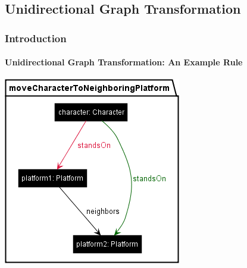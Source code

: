 \subsection{Unidirectional Graph Transformation}
	\begin{frame}
		\frametitle{Introduction}
		\framesubtitle{Unidirectional Graph Transformation: An Example Rule}
		\begin{center}
			\includegraphics[height=.75\textheight]{../common/figures/rule-moveCharacterToNeighboringPlatform}
		\end{center}
	\end{frame}

